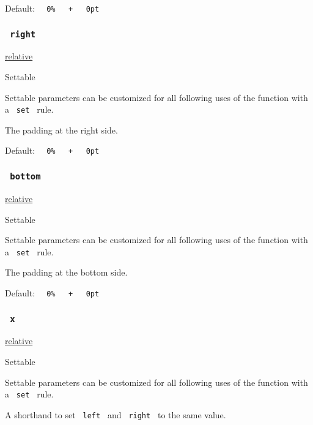 Default:
\texttt{\ }{\texttt{\ 0\%\ }}\texttt{\ }{\texttt{\ +\ }}\texttt{\ }{\texttt{\ 0pt\ }}\texttt{\ }

\subsubsection{\texorpdfstring{\texttt{\ right\ }}{ right }}\label{parameters-right}

\href{/docs/reference/layout/relative/}{relative}

{{ Settable }}

\label{parameters-right-settable-tooltip}
Settable parameters can be customized for all following uses of the
function with a \texttt{\ set\ } rule.

The padding at the right side.

Default:
\texttt{\ }{\texttt{\ 0\%\ }}\texttt{\ }{\texttt{\ +\ }}\texttt{\ }{\texttt{\ 0pt\ }}\texttt{\ }

\subsubsection{\texorpdfstring{\texttt{\ bottom\ }}{ bottom }}\label{parameters-bottom}

\href{/docs/reference/layout/relative/}{relative}

{{ Settable }}

\label{parameters-bottom-settable-tooltip}
Settable parameters can be customized for all following uses of the
function with a \texttt{\ set\ } rule.

The padding at the bottom side.

Default:
\texttt{\ }{\texttt{\ 0\%\ }}\texttt{\ }{\texttt{\ +\ }}\texttt{\ }{\texttt{\ 0pt\ }}\texttt{\ }

\subsubsection{\texorpdfstring{\texttt{\ x\ }}{ x }}\label{parameters-x}

\href{/docs/reference/layout/relative/}{relative}

{{ Settable }}

\label{parameters-x-settable-tooltip}
Settable parameters can be customized for all following uses of the
function with a \texttt{\ set\ } rule.

A shorthand to set \texttt{\ left\ } and \texttt{\ right\ } to the same
value.

